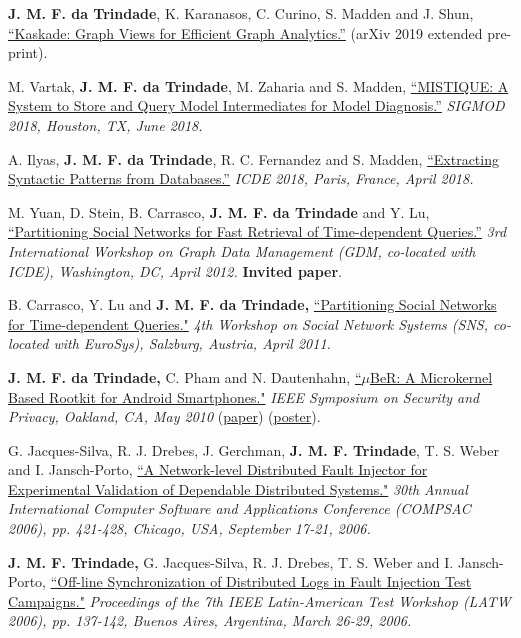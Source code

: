 \documentclass[line,margin]{res}
\begin{document}
\begin{resume}
\textbf{J. M. F. da Trindade}, K. Karanasos, C. Curino, S. Madden and J. Shun, \href{https://arxiv.org/abs/1906.05162}{``Kaskade: Graph Views for Efficient Graph Analytics.''} (arXiv 2019 extended pre-print).

M. Vartak, \textbf{J. M. F. da Trindade}, M. Zaharia and S. Madden, \href{https://cs.stanford.edu/~matei/papers/2018/sigmod_mistique.pdf}{``MISTIQUE: A System to Store and Query Model Intermediates for Model Diagnosis.''} \textit{SIGMOD 2018, Houston, TX, June 2018.}

A. Ilyas, \textbf{J. M. F. da Trindade}, R. C. Fernandez and S. Madden, \href{https://arxiv.org/pdf/1710.11528.pdf}{``Extracting Syntactic Patterns from Databases.''} \textit{ICDE 2018, Paris, France, April 2018.}

M. Yuan, D. Stein, B. Carrasco, \textbf{J. M. F. da Trindade} and Y. Lu, \href{http://joanatrindade.wdfiles.com/local--files/curriculum/gdm2012-paper.pdf}{``Partitioning Social Networks for Fast Retrieval of Time-dependent Queries.''} \textit{3rd International Workshop on Graph Data Management (GDM, co-located with ICDE), Washington, DC, April 2012.} \textbf{Invited paper}.

B. Carrasco, Y. Lu and \textbf{J. M. F. da Trindade,} \href{http://research.microsoft.com/en-us/projects/ldg/a04-carrasco.pdf}{``Partitioning Social Networks for Time-dependent Queries."} \textit{4th Workshop on Social Network Systems (SNS, co-located with EuroSys), Salzburg, Austria, April 2011.}

\textbf{J. M. F. da Trindade,} C. Pham and N. Dautenhahn, \href{http://joanatrindade.wikidot.com/local--files/curriculum/oakland2010-paper.pdf}{``$\mu$BeR: A Microkernel Based Rootkit for Android Smartphones."} \textit{IEEE Symposium on Security and Privacy, Oakland, CA, May 2010} (\href{http://joanatrindade.wikidot.com/local--files/curriculum/oakland2010-paper.pdf}{paper}) (\href{http://joanatrindade.wikidot.com/local--files/curriculum/oakland2010-poster.pdf}{poster}).

G. Jacques-Silva, R. J. Drebes, J. Gerchman, \textbf{J. M. F. Trindade}, T. S. Weber and I. Jansch-Porto, \href{http://doi.ieeecomputersociety.org/10.1109/COMPSAC.2006.12}{``A Network-level Distributed Fault Injector for Experimental Validation of Dependable Distributed Systems."} \textit{30th Annual International Computer Software and Applications Conference (COMPSAC 2006), pp. 421-428, Chicago, USA, September 17-21, 2006.}

\textbf{J. M. F. Trindade,} G. Jacques-Silva, R. J. Drebes, T. S. Weber and I. Jansch-Porto, \href{http://joanatrindade.wikidot.com/local--files/curriculum/latw2006.pdf}{``Off-line Synchronization of Distributed Logs in Fault Injection Test Campaigns."} \textit{Proceedings of the 7th IEEE Latin-American Test Workshop (LATW 2006), pp. 137-142, Buenos Aires, Argentina, March 26-29, 2006.}


\end{resume}
\end{document}

